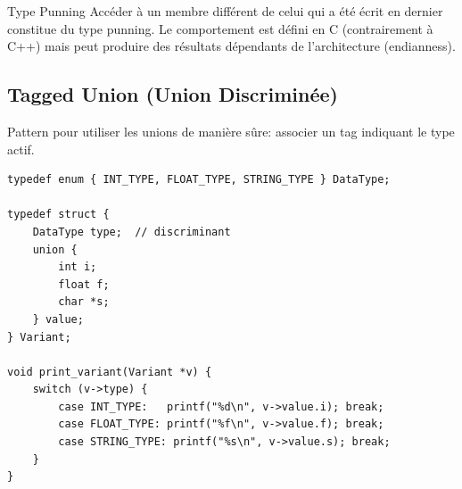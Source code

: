 \documentclass[10pt,a4paper]{article}
\begin{document}
\begin{center}
\end{center}

\begin{warningbox}{Type Punning}
Accéder à un membre différent de celui qui a été écrit en dernier constitue du type punning. Le comportement est défini en C (contrairement à C++) mais peut produire des résultats dépendants de l'architecture (endianness).
\end{warningbox}

\subsection{Tagged Union (Union Discriminée)}

Pattern pour utiliser les unions de manière sûre: associer un tag indiquant le type actif.

\begin{lstlisting}
typedef enum { INT_TYPE, FLOAT_TYPE, STRING_TYPE } DataType;

typedef struct {
    DataType type;  // discriminant
    union {
        int i;
        float f;
        char *s;
    } value;
} Variant;

void print_variant(Variant *v) {
    switch (v->type) {
        case INT_TYPE:   printf("%d\n", v->value.i); break;
        case FLOAT_TYPE: printf("%f\n", v->value.f); break;
        case STRING_TYPE: printf("%s\n", v->value.s); break;
    }
}
\end{lstlisting}
\end{document}
